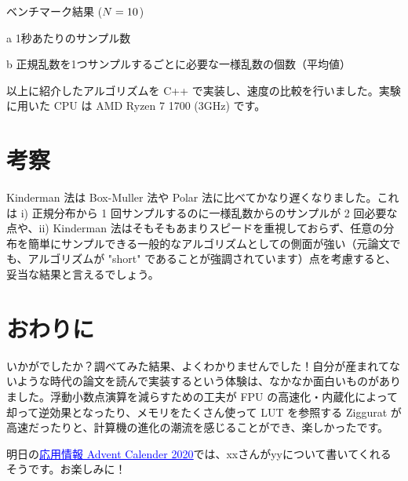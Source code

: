 \documentclass[twocolumn, dvipdfmx]{jsarticle}
\begin{document}
\begin{table}
    \caption{ベンチマーク結果 ($N = 10^{\protect}$)}
    \label{tab:benchmark-result}
    \begin{threeparttable}
        \centering
        
        \begin{tablenotes}
            \item[a] 1秒あたりのサンプル数
            \item[b] 正規乱数を1つサンプルするごとに必要な一様乱数の個数（平均値）
        \end{tablenotes}
    \end{threeparttable}
\end{table}

以上に紹介したアルゴリズムを C++ で実装し、速度の比較を行いました。実験に用いた CPU は AMD Ryzen 7 1700 (3GHz) です。

\section*{考察}

Kinderman 法は Box-Muller 法や Polar 法に比べてかなり遅くなりました。これは i) 正規分布から 1 回サンプルするのに一様乱数からのサンプルが 2 回必要な点や、ii) Kinderman 法はそもそもあまりスピードを重視しておらず、任意の分布を簡単にサンプルできる一般的なアルゴリズムとしての側面が強い（元論文でも、アルゴリズムが "short" であることが強調されています）点を考慮すると、妥当な結果と言えるでしょう。

\section*{おわりに}

いかがでしたか？調べてみた結果、よくわかりませんでした！自分が産まれてないような時代の論文を読んで実装するという体験は、なかなか面白いものがありました。浮動小数点演算を減らすための工夫が FPU の高速化・内蔵化によって却って逆効果となったり、メモリをたくさん使って LUT を参照する Ziggurat が高速だったりと、計算機の進化の潮流を感じることができ、楽しかったです。

明日の\href{https://adventar.org/calendars/5671}{\textcolor{blue}{\underline{応用情報 Advent Calender 2020}}}では、xxさんがyyについて書いてくれるそうです。お楽しみに！



\end{document}
